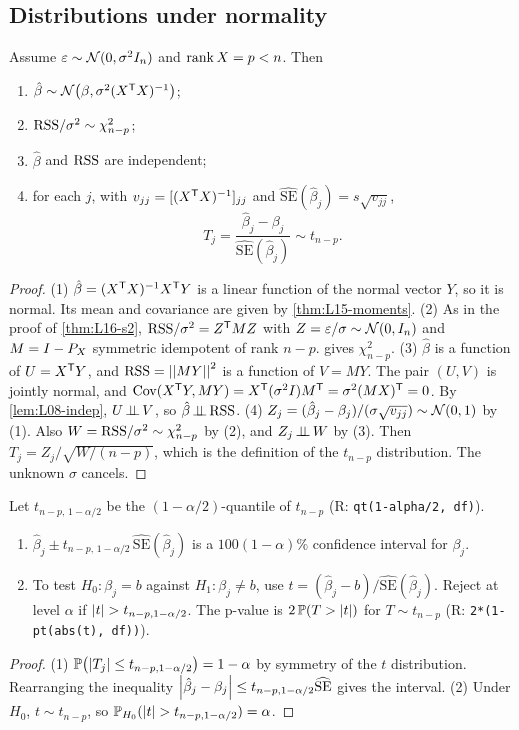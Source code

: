 \subsection{Distributions under normality}
\begin{theorem}\label{thm:L16-dist}
Assume $\varepsilon\sim\mathcal N(0,\sigma^2I_n)$ and $\operatorname{rank} X=p<n$. Then
\begin{enumerate}
  \item $\hat\beta\sim\mathcal N\bigl(\beta,\sigma^2(X^{\mathsf T} X)^{-1}\bigr)$;
  \item $\mathrm{RSS}/\sigma^2\sim\chi^2_{n-p}$;
  \item $\hat\beta$ and $\mathrm{RSS}$ are independent;
  \item for each $j$, with $v_{jj}=[(X^{\mathsf T} X)^{-1}]_{jj}$ and $\widehat{\mathrm{SE}}(\hat\beta_j)=s\sqrt{v_{jj}}$,
  \[
  T_j=\frac{\hat\beta_j-\beta_j}{\widehat{\mathrm{SE}}(\hat\beta_j)}\sim t_{n-p}.
  \]
\end{enumerate}
\end{theorem}
\begin{proof}
(1) $\hat\beta=(X^{\mathsf T} X)^{-1}X^{\mathsf T} Y$ is a linear function of the normal vector $Y$, so it is normal. Its mean and
covariance are given by \cref{thm:L15-moments}.
(2) As in the proof of \cref{thm:L16-s2}, $\mathrm{RSS}/\sigma^2=Z^{\mathsf T} MZ$ with $Z=\varepsilon/\sigma\sim\mathcal N(0,I_n)$ and $M=I-P_X$
symmetric idempotent of rank $n-p$.  gives $\chi^2_{n-p}$.
(3) $\hat\beta$ is a function of $U=X^{\mathsf T} Y$, and $\mathrm{RSS}=\left|\left|MY\right|\right|^2$ is a function of $V=MY$. The pair $(U,V)$ is jointly normal,
and $\operatorname{Cov}(X^{\mathsf T} Y,MY)=X^{\mathsf T}(\sigma^2I)M^{\mathsf T}=\sigma^2(MX)^{\mathsf T}=0$. By \cref{lem:L08-indep}, $U\operatorname{\perp\!\!\!\perp} V$, so $\hat\beta\operatorname{\perp\!\!\!\perp}\mathrm{RSS}$.
(4) $Z_j=(\hat\beta_j-\beta_j)/(\sigma\sqrt{v_{jj}})\sim\mathcal N(0,1)$ by (1). Also $W=\mathrm{RSS}/\sigma^2\sim\chi^2_{n-p}$ by (2), and $Z_j\operatorname{\perp\!\!\!\perp} W$ by (3).
Then $T_j=Z_j/\sqrt{W/(n-p)}$, which is the definition of the $t_{n-p}$ distribution. The unknown $\sigma$ cancels.
\end{proof}

\begin{corollary}\label{cor:L16-ci}
Let $t_{n-p,\,1-\alpha/2}$ be the $(1-\alpha/2)$-quantile of $t_{n-p}$ (R: \texttt{qt(1-alpha/2, df)}).
\begin{enumerate}
  \item $\hat\beta_j\pm t_{n-p,\,1-\alpha/2}\,\widehat{\mathrm{SE}}(\hat\beta_j)$ is a $100(1-\alpha)\%$ confidence interval for $\beta_j$.
  \item To test $H_0:\beta_j=b$ against $H_1:\beta_j\ne b$, use $t=(\hat\beta_j-b)/\widehat{\mathrm{SE}}(\hat\beta_j)$. Reject at level $\alpha$ if $\abs t>t_{n-p,1-\alpha/2}$. The p-value is $2\,\mathbb P(T>\left|t\right|)$ for $T\sim t_{n-p}$ (R: \texttt{2*(1-pt(abs(t), df))}).
\end{enumerate}
\end{corollary}
\begin{proof}
(1) $\mathbb P\bigl(\left|T_j\right|\le t_{n-p,1-\alpha/2}\bigr)=1-\alpha$ by symmetry of the $t$ distribution. Rearranging the inequality
$\left|\hat\beta_j-\beta_j\right|\le t_{n-p,1-\alpha/2}\widehat{\mathrm{SE}}$ gives the interval.
(2) Under $H_0$, $t\sim t_{n-p}$, so $\PP_{H_0}(\abs t>t_{n-p,1-\alpha/2})=\alpha$.
\end{proof}

